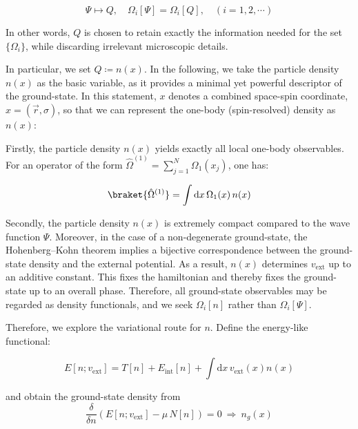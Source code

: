 \begin{equation}
    \Psi \mapsto Q,\quad\Omega_i[\Psi] = \Omega_i[Q],\quad(i=1,2,\cdots)
\label{descriptor_Q_mapping}
\end{equation}

In other words, $Q$ is chosen to retain exactly the information needed for the set $\{\Omega_i\}$, while discarding irrelevant microscopic details.

In particular, we set $Q \coloneqq n(x)$. In the following, we take the particle density $n(x)$ as the basic variable, as it provides a minimal yet powerful descriptor of the ground-state. In this statement, $x$ denotes a combined space-spin coordinate, $x=(\vec{r},\sigma)$, so that we can represent the one-body (spin-resolved) density as $n(x)$:

Firstly, the particle density $n(x)$ yields exactly all local one-body observables. For an operator of the form $\hat{\Omega}^{(1)}=\sum_{j=1}^N \Omega_1(x_j)$, one has:

\begin{equation}
    \braket{\hat{\Omega}^{(1)}}=\int \mathrm{d}x\,\Omega_1(x)\,n(x)
\label{one-body_observables}
\end{equation}

Secondly, the particle density $n(x)$ is extremely compact compared to the wave function $\Psi$.
Moreover, in the case of a non-degenerate ground-state, the Hohenberg--Kohn theorem implies a bijective correspondence between the ground-state density and the external potential.
As a result, $n(x)$ determines $v_\mathrm{ext}$ up to an additive constant.
This fixes the hamiltonian and thereby fixes the ground-state up to an overall phase.
Therefore, all ground-state observables may be regarded as density functionals, and we seek $\Omega_i[n]$ rather than $\Omega_i[\Psi]$.

Therefore, we explore the variational route for $n$. Define the energy-like functional:

\begin{equation}
    E[n;v_\mathrm{ext}]=T[n]+E_\mathrm{int}[n]+\int\mathrm{d}x\,v_\mathrm{ext}(x)n(x)
\label{energy-like_functional}
\end{equation}

and obtain the ground-state density from
\begin{equation}
    \frac{\delta}{\delta n}\left(E[n;v_\mathrm{ext}] - \mu\,N[n]\right)=0 \ \Rightarrow\ n_g(x)
\label{ground_state_density}
\end{equation}

